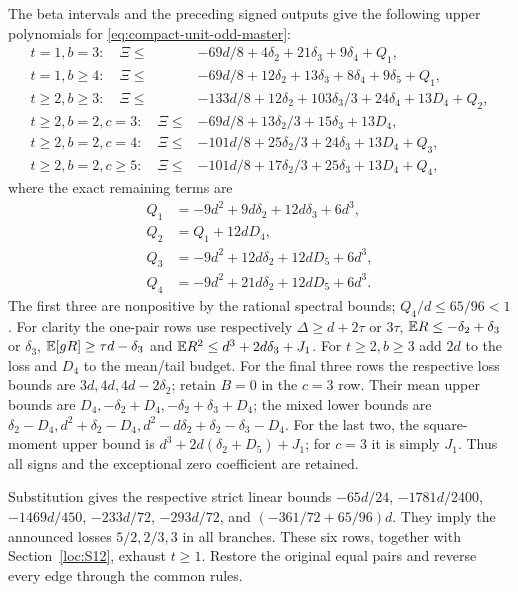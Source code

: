 The beta intervals and the preceding signed outputs give the following
upper polynomials for \eqref{eq:compact-unit-odd-master}:
\begin{align*}
 t=1,b=3:\quad\Xi\le{}&-69d/8+4\delta_{2}+21\delta_{3}+9\delta_{4}+Q_1,\\
 t=1,b\ge4:\quad\Xi\le{}&-69d/8+12\delta_{2}+13\delta_{3}+8\delta_{4}+9\delta_{5}+Q_1,\\
 t\ge2,b\ge3:\quad\Xi\le{}&-133d/8+12\delta_{2}+103\delta_{3}/3+24\delta_{4}+13D_4+Q_2,\\
 t\ge2,b=2,c=3:\quad\Xi\le{}&-69d/8+13\delta_{2}/3+15\delta_{3}+13D_4,\\
 t\ge2,b=2,c=4:\quad\Xi\le{}&-101d/8+25\delta_{2}/3+24\delta_{3}+13D_4+Q_3,\\
 t\ge2,b=2,c\ge5:\quad\Xi\le{}&-101d/8+17\delta_{2}/3+25\delta_{3}+13D_4+Q_4,
\end{align*}
where the exact remaining terms are
\begin{align*}
 Q_1&=-9d^2+9d\delta_{2}+12d\delta_{3}+6d^3,\\
 Q_2&=Q_1+12dD_4,\\
 Q_3&=-9d^2+12d\delta_{2}+12dD_5+6d^3,\\
 Q_4&=-9d^2+21d\delta_{2}+12dD_5+6d^3.
\end{align*}
The first three are nonpositive by the rational spectral bounds;
$Q_4/d\le65/96<1$.
For clarity the one-pair rows use respectively
$\Delta\ge d+2\tau$ or $3\tau$,
$\mathbb E R\le-\delta_{2}+\delta_{3}$ or $\delta_{3}$,
$\mathbb E[gR]\ge\tau d-\delta_{3}$ and $\mathbb E R^2\le d^3+2d\delta_{3}+J_1$.
For $t\ge2,b\ge3$ add $2d$ to the loss and $D_4$ to the mean/tail budget.
For the final three rows the respective loss bounds are
$3d,4d,4d-2\delta_{2}$; retain $B=0$ in the $c=3$ row.
Their mean upper bounds are $D_4,-\delta_{2}+D_4,-\delta_{2}+\delta_{3}+D_4$;
the mixed lower bounds are
$\delta_{2}-D_4,d^2+\delta_{2}-D_4,d^2-d\delta_{2}+\delta_{2}-\delta_{3}-D_4$.
For the last two, the square-moment upper bound is
$d^3+2d(\delta_{2}+D_5)+J_1$; for $c=3$ it is simply $J_1$.
Thus all signs and the exceptional zero coefficient are retained.

Substitution gives the respective strict linear bounds
$-65d/24$, $-1781d/2400$, $-1469d/450$, $-233d/72$,
$-293d/72$, and $(-361/72+65/96)d$.
They imply the announced losses $5/2,2/3,3$ in all branches.
These six rows, together with Section~\ref{loc:S12}, exhaust $t\ge1$.
Restore the original equal pairs and reverse every edge through the common rules.
